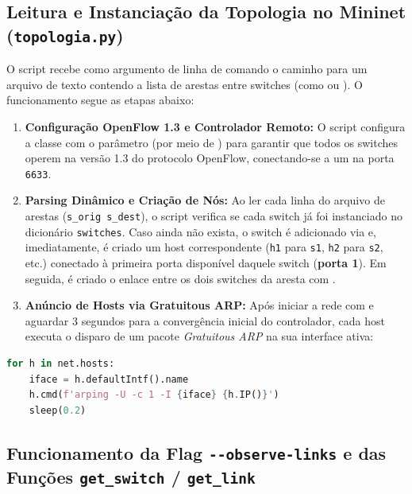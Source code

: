 \documentclass[12pt,a4paper]{article}
\begin{document}
\subsection{Leitura e Instanciação da Topologia no Mininet (\texttt{topologia.py})}

O script  recebe como argumento de linha de comando o caminho para um arquivo de texto contendo a lista de arestas entre switches (como  ou ). O funcionamento segue as etapas abaixo:

\begin{enumerate}
    \item \textbf{Configuração OpenFlow 1.3 e Controlador Remoto:} O script configura a classe  com o parâmetro  (por meio de ) para garantir que todos os switches operem na versão 1.3 do protocolo OpenFlow, conectando-se a um  na porta \texttt{6633}.
    \item \textbf{Parsing Dinâmico e Criação de Nós:} Ao ler cada linha do arquivo de arestas (\texttt{s\_orig s\_dest}), o script verifica se cada switch já foi instanciado no dicionário \texttt{switches}. Caso ainda não exista, o switch é adicionado via  e, imediatamente, é criado um host correspondente (\texttt{h1} para \texttt{s1}, \texttt{h2} para \texttt{s2}, etc.) conectado à primeira porta disponível daquele switch (\textbf{porta 1}). Em seguida, é criado o enlace entre os dois switches da aresta com .
    \item \textbf{Anúncio de Hosts via Gratuitous ARP:} Após iniciar a rede com  e aguardar 3 segundos para a convergência inicial do controlador, cada host executa o disparo de um pacote \textit{Gratuitous ARP} na sua interface ativa:
\end{enumerate}

\begin{lstlisting}[language=Python, caption={Trecho de instanciacao e disparo do Gratuitous ARP em topologia.py}]
for h in net.hosts:
    iface = h.defaultIntf().name
    h.cmd(f'arping -U -c 1 -I {iface} {h.IP()}')
    sleep(0.2)
\end{lstlisting}

\subsection{Funcionamento da Flag \texttt{{-}{-}observe-links} e das Funções \texttt{get\_switch} / \texttt{get\_link}}
\end{document}
